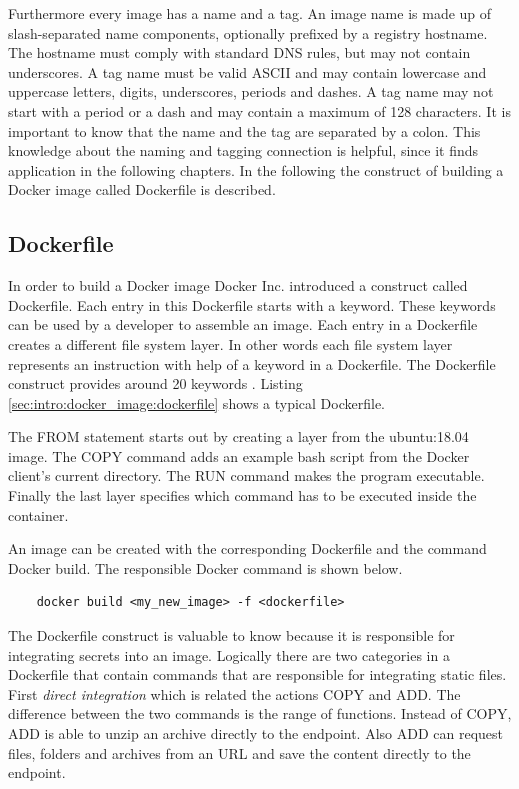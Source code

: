 Furthermore every image has a name and a tag. An image name is made up of slash-separated name components, optionally prefixed by a registry hostname. The hostname must comply with standard DNS rules, but may not contain underscores. A tag name must be valid ASCII and may contain lowercase and uppercase letters, digits, underscores, periods and dashes. A tag name may not start with a period or a dash and may contain a maximum of 128 characters.
It is important to know that the name and the tag are separated by a colon.
This knowledge about the naming and tagging connection is helpful, since it finds application in the following chapters. In the following the construct of building a Docker image called Dockerfile is described.

\subsection{Dockerfile}
\label{sec:intro:docker_image:docker_img:dockerfile}
In order to build a Docker image Docker Inc. introduced a construct called Dockerfile.
Each entry in this Dockerfile starts with a keyword. These keywords can be used by a developer to assemble an image. Each entry in a Dockerfile creates a different file system layer. In other words each file system layer represents an instruction with help of a keyword in a Dockerfile.
The Dockerfile construct provides around 20 keywords \cite{dockerfile_ref}.
Listing \ref{sec:intro:docker_image:dockerfile} shows a typical Dockerfile.

The FROM statement starts out by creating a layer from the ubuntu:18.04 image. The COPY command adds an example bash script from the Docker client’s current directory. The RUN command makes the program executable. Finally the last layer specifies which command has to be executed inside the container.

An image can be created with the corresponding Dockerfile and the command Docker build. The responsible Docker command is shown below.
\begin{lstlisting}
	docker build <my_new_image> -f <dockerfile>
\end{lstlisting}
The Dockerfile construct is valuable to know because it is responsible for integrating secrets into an image. 
Logically there are two categories in a Dockerfile that contain commands that are responsible for integrating static files.
First \textit{direct integration} which is related the actions COPY and ADD. The difference between the two commands is the range of functions. Instead of COPY, ADD is able to unzip an archive directly to the endpoint.
Also ADD can request files, folders and archives from an URL and save the content directly to the endpoint.

